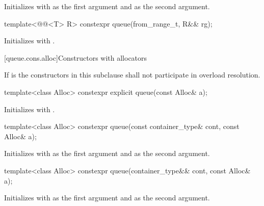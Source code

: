 \begin{itemdescr}
\pnum
\effects
Initializes  with
 as the first argument and  as the second argument.
\end{itemdescr}

%
\begin{itemdecl}
template<@@<T> R>
  constexpr queue(from_range_t, R&& rg);
\end{itemdecl}

\begin{itemdescr}
\pnum
\effects
Initializes  with .
\end{itemdescr}

[queue.cons.alloc]{Constructors with allocators}

\pnum
If  is 
the constructors in this subclause shall not participate in overload resolution.

%
\begin{itemdecl}
template<class Alloc> constexpr explicit queue(const Alloc& a);
\end{itemdecl}

\begin{itemdescr}
\pnum
\effects
Initializes  with .
\end{itemdescr}

%
\begin{itemdecl}
template<class Alloc> constexpr queue(const container_type& cont, const Alloc& a);
\end{itemdecl}

\begin{itemdescr}
\pnum
\effects
Initializes  with  as the first argument and 
as the second argument.
\end{itemdescr}

%
\begin{itemdecl}
template<class Alloc> constexpr queue(container_type&& cont, const Alloc& a);
\end{itemdecl}

\begin{itemdescr}
\pnum
\effects
Initializes  with  as the first argument and 
as the second argument.
\end{itemdescr}

